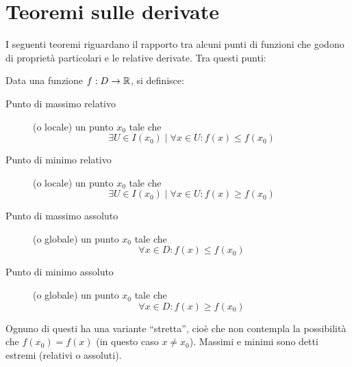 \section{Teoremi sulle derivate}
I seguenti teoremi riguardano il rapporto tra alcuni punti di funzioni che godono di proprietà particolari e le relative derivate. Tra questi punti:
\begin{defin}
	Data una funzione $f:D\to\mathbb{R}$, si definisce:
	\begin{description}
		\item[Punto di massimo relativo] (o locale) un punto $x_0$ tale che
			\[
				\exists U\in I(x_0)\mid\forall x\in U: f(x)\leq f(x_0)
			\]
		\item[Punto di minimo relativo] (o locale) un punto $x_0$ tale che
			\[
				\exists U\in I(x_0)\mid\forall x\in U: f(x)\geq f(x_0)
			\]
		\item[Punto di massimo assoluto] (o globale) un punto $x_0$ tale che
			\[
				\forall x\in D: f(x)\leq f(x_0)
			\]
		\item[Punto di minimo assoluto] (o globale) un punto $x_0$ tale che
			\[
				\forall x\in D: f(x)\geq f(x_0)
			\]
	\end{description}
	Ognuno di questi ha una variante ``stretta'', cioè che non contempla la possibilità che $f(x_0)=f(x)$ (in questo caso $x\neq x_0$). Massimi e minimi sono detti estremi (relativi o assoluti).
\end{defin}


